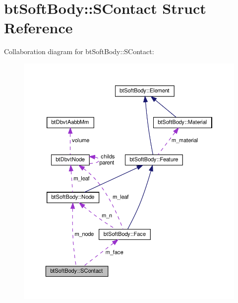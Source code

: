 \hypertarget{structbtSoftBody_1_1SContact}{}\section{bt\+Soft\+Body\+:\+:S\+Contact Struct Reference}
\label{structbtSoftBody_1_1SContact}


Collaboration diagram for bt\+Soft\+Body\+:\+:S\+Contact\+:
\nopagebreak
\begin{figure}[H]
\begin{center}
\leavevmode
\includegraphics[width=350pt]{structbtSoftBody_1_1SContact__coll__graph}
\end{center}
\end{figure}
